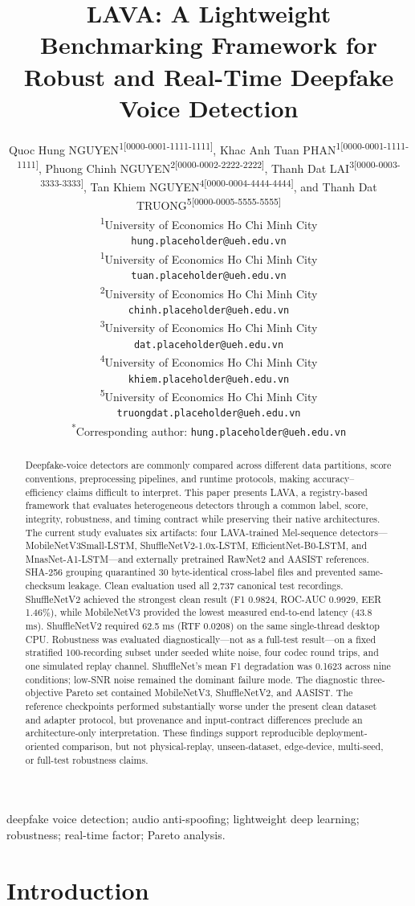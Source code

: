 \documentclass[10pt,journal,onecolumn]{IEEEtran}
\title{LAVA: A Lightweight Benchmarking Framework for Robust and Real-Time Deepfake Voice Detection}
\author{%
\parbox{0.96\textwidth}{\centering
Quoc Hung NGUYEN\textsuperscript{1[0000-0001-1111-1111]},
Khac Anh Tuan PHAN\textsuperscript{1[0000-0001-1111-1111]},
Phuong Chinh NGUYEN\textsuperscript{2[0000-0002-2222-2222]},
Thanh Dat LAI\textsuperscript{3[0000-0003-3333-3333]},
Tan Khiem NGUYEN\textsuperscript{4[0000-0004-4444-4444]}, and
Thanh Dat TRUONG\textsuperscript{5[0000-0005-5555-5555]}

\par\vspace{1em}

\textsuperscript{1}University of Economics Ho Chi Minh City\\
\texttt{hung.placeholder@ueh.edu.vn}\\[0.35em]

\textsuperscript{1}University of Economics Ho Chi Minh City\\
\texttt{tuan.placeholder@ueh.edu.vn}\\[0.35em]

\textsuperscript{2}University of Economics Ho Chi Minh City\\
\texttt{chinh.placeholder@ueh.edu.vn}\\[0.35em]

\textsuperscript{3}University of Economics Ho Chi Minh City\\
\texttt{dat.placeholder@ueh.edu.vn}\\[0.35em]

\textsuperscript{4}University of Economics Ho Chi Minh City\\
\texttt{khiem.placeholder@ueh.edu.vn}\\[0.35em]

\textsuperscript{5}University of Economics Ho Chi Minh City\\
\texttt{truongdat.placeholder@ueh.edu.vn}

\par\vspace{0.4em}

\textsuperscript{*}Corresponding author:
\texttt{hung.placeholder@ueh.edu.vn}
}}
\begin{document}
\maketitle
\begin{abstract}
Deepfake-voice detectors are commonly compared across different data partitions, score conventions, preprocessing pipelines, and runtime protocols, making accuracy--efficiency claims difficult to interpret. This paper presents LAVA, a registry-based framework that evaluates heterogeneous detectors through a common label, score, integrity, robustness, and timing contract while preserving their native architectures. The current study evaluates six artifacts: four LAVA-trained Mel-sequence detectors---MobileNetV3Small-LSTM, ShuffleNetV2-1.0x-LSTM, EfficientNet-B0-LSTM, and MnasNet-A1-LSTM---and externally pretrained RawNet2 and AASIST references. SHA-256 grouping quarantined 30 byte-identical cross-label files and prevented same-checksum leakage. Clean evaluation used all 2,737 canonical test recordings. ShuffleNetV2 achieved the strongest clean result (F1 0.9824, ROC-AUC 0.9929, EER 1.46\%), while MobileNetV3 provided the lowest measured end-to-end latency (43.8 ms). ShuffleNetV2 required 62.5 ms (RTF 0.0208) on the same single-thread desktop CPU. Robustness was evaluated diagnostically---not as a full-test result---on a fixed stratified 100-recording subset under seeded white noise, four codec round trips, and one simulated replay channel. ShuffleNet's mean F1 degradation was 0.1623 across nine conditions; low-SNR noise remained the dominant failure mode. The diagnostic three-objective Pareto set contained MobileNetV3, ShuffleNetV2, and AASIST. The reference checkpoints performed substantially worse under the present clean dataset and adapter protocol, but provenance and input-contract differences preclude an architecture-only interpretation. These findings support reproducible deployment-oriented comparison, but not physical-replay, unseen-dataset, edge-device, multi-seed, or full-test robustness claims.
\end{abstract}
\begin{IEEEkeywords}deepfake voice detection; audio anti-spoofing; lightweight deep learning; robustness; real-time factor; Pareto analysis.\end{IEEEkeywords}
\section{Introduction}
\end{document}
